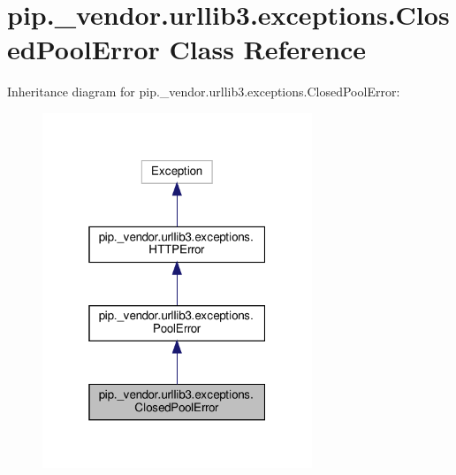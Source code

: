 \hypertarget{classpip_1_1__vendor_1_1urllib3_1_1exceptions_1_1ClosedPoolError}{}\section{pip.\+\_\+vendor.\+urllib3.\+exceptions.\+Closed\+Pool\+Error Class Reference}
\label{classpip_1_1__vendor_1_1urllib3_1_1exceptions_1_1ClosedPoolError}


Inheritance diagram for pip.\+\_\+vendor.\+urllib3.\+exceptions.\+Closed\+Pool\+Error\+:
\nopagebreak
\begin{figure}[H]
\begin{center}
\leavevmode
\includegraphics[width=229pt]{classpip_1_1__vendor_1_1urllib3_1_1exceptions_1_1ClosedPoolError__inherit__graph}
\end{center}
\end{figure}


